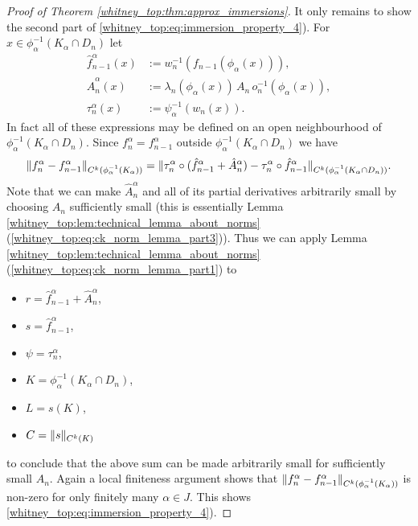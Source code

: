 \begin{proof}[Proof of Theorem \ref{whitney_top:thm:approx_immersions}]
    It only remains to show the second part of \ref{whitney_top:eq:immersion_property_4}). For $x \in \phi_\alpha^{-1}(K_\alpha \cap D_n)$ let 
    \begin{align*}
        \hat{f}_{n-1}^\alpha(x) &:= w_n^{-1}(f_{n-1}(\phi_\alpha(x))), \\
        \hat{A}_n^\alpha(x) &:= \lambda_n(\phi_\alpha(x)) \, A_n \, o_n^{-1}(\phi_\alpha(x)), \\
        \tau_n^\alpha(x) &:= \psi_\alpha^{-1}(w_n(x)).
    \end{align*}
    In fact all of these expressions may be defined on an open neighbourhood of $\phi_\alpha^{-1}(K_\alpha \cap D_n)$. Since $f_n^\alpha = f_{n-1}^\alpha$ outside $\phi_\alpha^{-1}(K_\alpha \cap D_n)$ we have 
    \[
    \lVert f_n^\alpha - f_{n-1}^\alpha\rVert_{C^k(\phi_\alpha^{-1}(K_\alpha))} = \lVert\tau_n^\alpha \circ (\hat{f}_{n-1}^\alpha + \hat{A}_n^\alpha) - \tau_n^\alpha \circ \hat{f}_{n-1}^\alpha\rVert_{C^k(\phi_\alpha^{-1}(K_\alpha \cap D_n))}.
    \]
    Note that we can make $\hat{A}_n^\alpha$ and all of its partial derivatives arbitrarily small by choosing $A_n$ sufficiently small (this is essentially Lemma \ref{whitney_top:lem:technical_lemma_about_norms} (\ref{whitney_top:eq:ck_norm_lemma_part3})). Thus we can apply Lemma \ref{whitney_top:lem:technical_lemma_about_norms} (\ref{whitney_top:eq:ck_norm_lemma_part1}) to 
    \begin{itemize}
    \item $r = \hat{f}_{n-1}^\alpha + \hat{A}_n^\alpha$,
    \item $s = \hat{f}_{n-1}^\alpha$,
    \item $\psi = \tau_n^\alpha$,
    \item $K = \phi_\alpha^{-1}(K_\alpha \cap D_n)$,
    \item $L = s(K)$,
    \item $C = \lVert s\rVert_{C^k(K)}$
    \end{itemize} 
    to conclude that the above sum can be made arbitrarily small for sufficiently small $A_n$. Again a local finiteness argument shows that $\lVert f_n^\alpha - f_{n-1}^\alpha\rVert_{C^k(\phi_\alpha^{-1}(K_\alpha))}$ is non-zero for only finitely many $\alpha \in J$. This shows \ref{whitney_top:eq:immersion_property_4}).


\end{proof}
